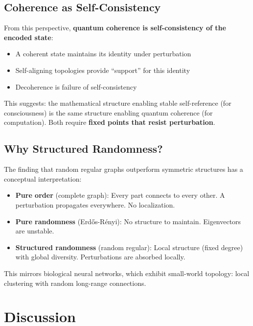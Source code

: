 \documentclass[11pt,a4paper]{article}
\theoremstyle{definition}
\begin{document}
\subsection{Coherence as Self-Consistency}

From this perspective, \textbf{quantum coherence is self-consistency of the encoded state}:
\begin{itemize}[noitemsep]
    \item A coherent state maintains its identity under perturbation
    \item Self-aligning topologies provide ``support'' for this identity
    \item Decoherence is failure of self-consistency
\end{itemize}

This suggests: the mathematical structure enabling stable self-reference (for consciousness) is the same structure enabling quantum coherence (for computation). Both require \textbf{fixed points that resist perturbation}.

\subsection{Why Structured Randomness?}

The finding that random regular graphs outperform symmetric structures has a conceptual interpretation:
\begin{itemize}[noitemsep]
    \item \textbf{Pure order} (complete graph): Every part connects to every other. A perturbation propagates everywhere. No localization.
    \item \textbf{Pure randomness} (Erdős-Rényi): No structure to maintain. Eigenvectors are unstable.
    \item \textbf{Structured randomness} (random regular): Local structure (fixed degree) with global diversity. Perturbations are absorbed locally.
\end{itemize}

This mirrors biological neural networks, which exhibit small-world topology: local clustering with random long-range connections.

\section{Discussion}
\label{sec:discussion}
\end{document}
